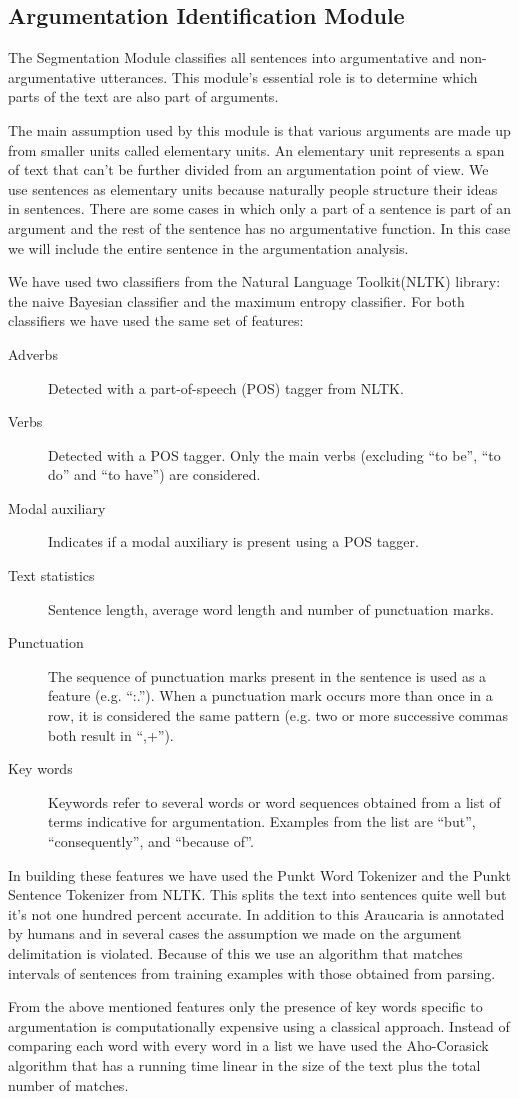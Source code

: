 \subsection{Argumentation Identification Module}
\par
The Segmentation Module classifies all sentences into argumentative and non-argumentative utterances. This module's essential role is to determine which parts of the text are also part of arguments.
\par
The main assumption used by this module is that various arguments are made up from smaller units called elementary units. An elementary unit represents a span of text that can't be further divided from an argumentation point of view. We use sentences as elementary units because naturally people structure their ideas in sentences. There are some cases in which only a part of a sentence is part of an argument and the rest of the sentence has no argumentative function. In this case we will include the entire sentence in the argumentation analysis.
\par
We have used two classifiers from the Natural Language Toolkit(NLTK)\label{NLTK} library: the naive Bayesian classifier and the maximum entropy classifier. For both classifiers we have used the same set of features:
\begin{description}
\item[Adverbs] Detected with a part-of-speech (POS) tagger from NLTK.
\item[Verbs] Detected with a POS tagger. Only the main verbs (excluding ``to be'', ``to do'' and ``to have'') are considered.
\item[Modal auxiliary] Indicates if a modal auxiliary is present using a POS tagger.
\item[Text statistics] Sentence length, average word length and number of punctuation marks.
\item[Punctuation] The sequence of punctuation marks present in the sentence is used as a feature (e.g. ``:.''). When a punctuation mark occurs more than once in a row, it is considered the same pattern (e.g. two or more successive commas both result in ``,+'').
\item[Key words] Keywords refer to several words or word sequences obtained from a list of terms indicative for argumentation. Examples from the list are ``but'', ``consequently'', and ``because of''.
\end{description}
\par
In building these features we have used the Punkt Word Tokenizer and the Punkt Sentence Tokenizer from NLTK. This splits the text into sentences quite well but it's not one hundred percent accurate. In addition to this Araucaria is annotated by humans and in several cases the assumption we made on the argument delimitation is violated. Because of this we use an algorithm that matches intervals of sentences from training examples with those obtained from parsing.
\par
From the above mentioned features only the presence of key words specific to argumentation is computationally expensive using a classical approach. Instead of comparing each word with every word in a list we have used the Aho-Corasick algorithm that has a running time linear in the size of the text plus the total number of matches.
